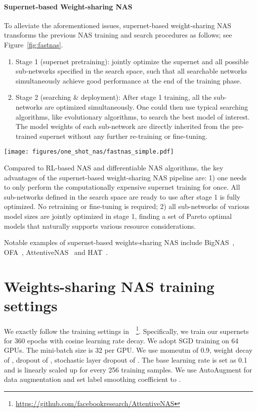 \documentclass{article}
\begin{document}
\paragraph{Supernet-based Weight-sharing NAS}
To alleviate the aforementioned issues, supernet-based  weight-sharing NAS transforms the previous NAS training and search procedures as follows; see Figure~\ref{fig:fastnas}.
\begin{enumerate}
\item[1)] Stage 1  (supernet pretraining): jointly optimize the supernet and all possible sub-networks specified in the search space, such that all searchable networks simultaneously achieve good performance at the end of the training phase.

\item[2)]  Stage 2 (searching \& deployment): 
After stage 1 training, all the sub-networks are optimized simultaneously. 
One could then use typical searching algorithms, like evolutionary algorithms, to search the best model of interest. The model weights of each sub-network are directly inherited from the pre-trained supernet without any further re-training or fine-tuning.
\end{enumerate}

\begin{figure*}[h]
    \centering
    \texttt{[image: figures/one\_shot\_nas/fastnas\_simple.pdf]}
    \caption{An overview of supernet-based weight-sharing NAS.}
    \label{fig:fastnas}
\end{figure*}


Compared to RL-based NAS and differentiable NAS algorithms, the key advantages of the supernet-based weight-sharing NAS pipeline are: 1) one needs to only perform the computationally expensive supernet training for once. All sub-networks defined in the search space are ready to use after stage 1 is fully optimized. No retraining or fine-tuning is required;
2) all sub-networks of various model sizes are jointly optimized in stage 1, finding a set of Pareto optimal models that naturally supports various resource considerations. 

Notable examples of supernet-based weights-sharing NAS include
BigNAS~\citep{yu2020bignas}, OFA~\citep{cai2019once}, AttentiveNAS~\citep{wang2020attentivenas} and HAT~\citep{wang2020hat}.



\section{Weights-sharing NAS training settings}
\label{app:supernet}
We exactly follow the training settings in~\citet{wang2020attentivenas}~\footnote{\url{https://github.com/facebookresearch/AttentiveNAS}}. 
Specifically, 
we train our supernets for 360 epochs with cosine learning rate decay. 
We adopt SGD training on 64 GPUs. The mini-batch size is 32 per GPU. 
We use momeutm of 0.9, weight decay of , dropout of , stochastic layer dropout of . 
The base learning rate is set as 0.1 and is linearly scaled up for every 256 training samples. 
We use  AutoAugment \cite{cubuk2018autoaugment}  for data augmentation and set label smoothing coefficient to .
\end{document}
